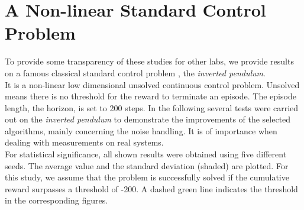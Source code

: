 \documentclass[
reprint,nofootinbib,
amsmath,amssymb,amsfonts,clevref,
aps,
prstab,
]{revtex4-2}
\begin{document}
	\section{A Non-linear Standard Control Problem}
	To provide some transparency of these studies for other labs, we provide results on a famous classical standard control problem \cite{Furutaa}, the \emph{inverted pendulum}.\\
	It is a non-linear low dimensional unsolved continuous control problem. Unsolved means there is no threshold for the reward to terminate an episode. The episode length, the horizon, is set to 200 steps. In the following several tests were carried out on the \emph{inverted pendulum} to demonstrate the improvements of the selected algorithms, mainly concerning the noise handling. It is of importance when dealing with measurements on real systems.\\
	For statistical significance, all shown results were obtained using five different seeds. The average value and the standard deviation (shaded) are plotted. For this study, we assume that the problem is successfully solved if the cumulative reward surpasses a threshold of -200. A dashed green line indicates the threshold in the corresponding figures.
	
\end{document}
